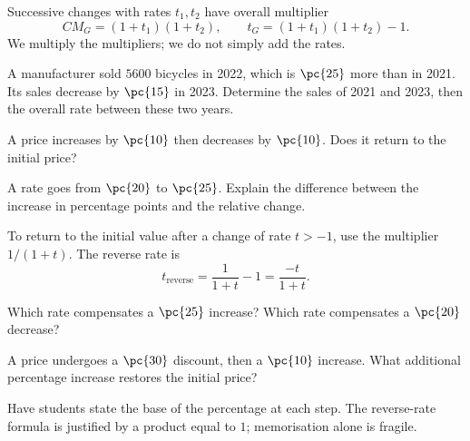 \begin{keypoint}[Property]
Successive changes with rates $t_1,t_2$ have overall multiplier
\[CM_G=(1+t_1)(1+t_2),\qquad t_G=(1+t_1)(1+t_2)-1.\]
We multiply the multipliers; we do not simply add the rates.
\end{keypoint}
\begin{example}A manufacturer sold $5600$ bicycles in 2022, which is $\pc{25}$ more than in 2021. Its sales decrease by $\pc{15}$ in 2023. Determine the sales of 2021 and 2023, then the overall rate between these two years.\end{example}
\begin{example}A price increases by $\pc{10}$ then decreases by $\pc{10}$. Does it return to the initial price?\end{example}
\begin{example}A rate goes from $\pc{20}$ to $\pc{25}$. Explain the difference between the increase in percentage points and the relative change.\end{example}

\begin{keypoint}[Property]
To return to the initial value after a change of rate $t>-1$, use the multiplier $1/(1+t)$. The reverse rate is
\[t_{\text{reverse}}=\frac1{1+t}-1=\frac{-t}{1+t}.\]
\end{keypoint}
\begin{example}Which rate compensates a $\pc{25}$ increase? Which rate compensates a $\pc{20}$ decrease?\end{example}
\begin{example}A price undergoes a $\pc{30}$ discount, then a $\pc{10}$ increase. What additional percentage increase restores the initial price?\end{example}
\begin{teachernote}Have students state the base of the percentage at each step. The reverse-rate formula is justified by a product equal to $1$; memorisation alone is fragile.\end{teachernote}
